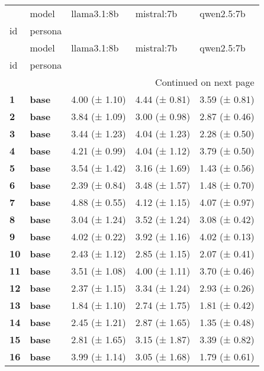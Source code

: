 \begin{longtable}{lllll}
\toprule
 & model & llama3.1:8b & mistral:7b & qwen2.5:7b \\
id & persona &  &  &  \\
\midrule
\endfirsthead
\toprule
 & model & llama3.1:8b & mistral:7b & qwen2.5:7b \\
id & persona &  &  &  \\
\midrule
\endhead
\midrule
\multicolumn{5}{r}{Continued on next page} \\
\midrule
\endfoot
\bottomrule
\endlastfoot
\textbf{1} & \textbf{base} & 4.00 (± 1.10) & 4.44 (± 0.81) & 3.59 (± 0.81) \\
\cline{1-5}
\textbf{2} & \textbf{base} & 3.84 (± 1.09) & 3.00 (± 0.98) & 2.87 (± 0.46) \\
\cline{1-5}
\textbf{3} & \textbf{base} & 3.44 (± 1.23) & 4.04 (± 1.23) & 2.28 (± 0.50) \\
\cline{1-5}
\textbf{4} & \textbf{base} & 4.21 (± 0.99) & 4.04 (± 1.12) & 3.79 (± 0.50) \\
\cline{1-5}
\textbf{5} & \textbf{base} & 3.54 (± 1.42) & 3.16 (± 1.69) & 1.43 (± 0.56) \\
\cline{1-5}
\textbf{6} & \textbf{base} & 2.39 (± 0.84) & 3.48 (± 1.57) & 1.48 (± 0.70) \\
\cline{1-5}
\textbf{7} & \textbf{base} & 4.88 (± 0.55) & 4.12 (± 1.15) & 4.07 (± 0.97) \\
\cline{1-5}
\textbf{8} & \textbf{base} & 3.04 (± 1.24) & 3.52 (± 1.24) & 3.08 (± 0.42) \\
\cline{1-5}
\textbf{9} & \textbf{base} & 4.02 (± 0.22) & 3.92 (± 1.16) & 4.02 (± 0.13) \\
\cline{1-5}
\textbf{10} & \textbf{base} & 2.43 (± 1.12) & 2.85 (± 1.15) & 2.07 (± 0.41) \\
\cline{1-5}
\textbf{11} & \textbf{base} & 3.51 (± 1.08) & 4.00 (± 1.11) & 3.70 (± 0.46) \\
\cline{1-5}
\textbf{12} & \textbf{base} & 2.37 (± 1.15) & 3.34 (± 1.24) & 2.93 (± 0.26) \\
\cline{1-5}
\textbf{13} & \textbf{base} & 1.84 (± 1.10) & 2.74 (± 1.75) & 1.81 (± 0.42) \\
\cline{1-5}
\textbf{14} & \textbf{base} & 2.45 (± 1.21) & 2.87 (± 1.65) & 1.35 (± 0.48) \\
\cline{1-5}
\textbf{15} & \textbf{base} & 2.81 (± 1.65) & 3.15 (± 1.87) & 3.39 (± 0.82) \\
\cline{1-5}
\textbf{16} & \textbf{base} & 3.99 (± 1.14) & 3.05 (± 1.68) & 1.79 (± 0.61) \\

\end{longtable}

